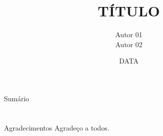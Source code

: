 \documentclass[handout,t]{beamer}
\title[SUBTÍTULO]{
	TÍTULO}
\date{
	DATA}
\author[AUTOR]{
	Autor 01 \inst{1}\\
	\vspace{0.25cm}
	Autor 02 \inst{2}}
\institute[INSTITUTO]{
	\inst{1}%
	\url{usuario@mail.com}\\
	\vspace{0.25cm}
	\inst{2}%
	Departamento\\
	Universidade}
\begin{document}
\frame{\titlepage}
\section[]{}
\begin{frame}{Sumário}
	\tableofcontents
\end{frame}











\section{}
\begin{frame}{Agradecimentos}
	Agradeço a todos. 	
\end{frame}
\end{document}
